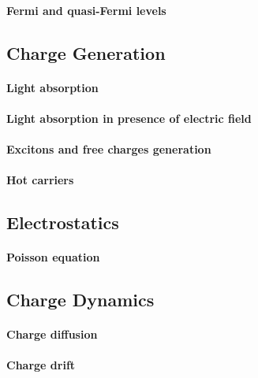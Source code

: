 \paragraph{Fermi and quasi-Fermi levels}

\subsection{Charge Generation}

\paragraph{Light absorption}

\paragraph{Light absorption in presence of electric field}\label{intro_electroabsorbance}

\paragraph{Excitons and free charges generation}

\paragraph{Hot carriers}

\subsection{Electrostatics}

\paragraph{Poisson equation}
	
\subsection{Charge Dynamics}

\paragraph{Charge diffusion}

\paragraph{Charge drift}

